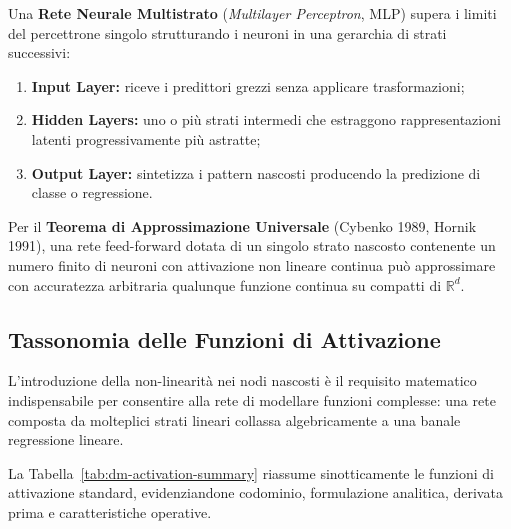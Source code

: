 Una \textbf{Rete Neurale Multistrato} (\textit{Multilayer Perceptron}, MLP) supera i limiti del percettrone singolo strutturando i neuroni in una gerarchia di strati successivi:
\begin{enumerate}
    \item \textbf{Input Layer:} riceve i predittori grezzi senza applicare trasformazioni;
    \item \textbf{Hidden Layers:} uno o più strati intermedi che estraggono rappresentazioni latenti progressivamente più astratte;
    \item \textbf{Output Layer:} sintetizza i pattern nascosti producendo la predizione di classe o regressione.
\end{enumerate}

Per il \textbf{Teorema di Approssimazione Universale} (Cybenko 1989, Hornik 1991), una rete feed-forward dotata di un singolo strato nascosto contenente un numero finito di neuroni con attivazione non lineare continua può approssimare con accuratezza arbitraria qualunque funzione continua su compatti di $\mathbb{R}^d$.

\FloatBarrier
\subsection{Tassonomia delle Funzioni di Attivazione}
\label{subsec:dm-activation-functions}

L'introduzione della non-linearità nei nodi nascosti è il requisito matematico indispensabile per consentire alla rete di modellare funzioni complesse: una rete composta da molteplici strati lineari collassa algebricamente a una banale regressione lineare.

La Tabella~\ref{tab:dm-activation-summary} riassume sinotticamente le funzioni di attivazione standard, evidenziandone codominio, formulazione analitica, derivata prima e caratteristiche operative.

